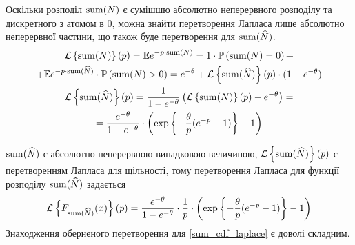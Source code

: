 Оскільки розподіл $\operatorname{sum}(N)$ є сумішшю абсолютно неперервного розподілу та
дискретного з атомом в 0, можна знайти перетворення Лапласа
лише абсолютно неперервної частини, що також буде перетворення для
$\operatorname{sum}(\widehat{N})$.
\begin{gather}
    \mathcal{L}\left\{\operatorname{sum}(N)\right\}(p) = \mathbb{E} e^{-p\cdot\operatorname{sum}(N)} = 
    1 \cdot \mathbb{P}\left(\operatorname{sum}(N) = 0\right) + \nonumber \\ +
    \mathbb{E} e^{-p\cdot\operatorname{sum}(\widehat{N})} \cdot \mathbb{P}\left(\operatorname{sum}(N) > 0\right) =
    e^{-\theta} + \mathcal{L}\left\{\operatorname{sum}(\widehat{N})\right\}(p) \cdot (1-e^{-\theta})
    \nonumber \\
    \mathcal{L}\left\{\operatorname{sum}(\widehat{N})\right\}(p) = \frac{1}{1 - e^{-\theta}}
    \left(\mathcal{L}\left\{\operatorname{sum}(N)\right\}(p) - e^{-\theta}\right) = \nonumber \\ =
    \label{laplace_of_sum_cont}
    \frac{e^{-\theta}}{1 - e^{-\theta}} \cdot 
    \left(\exp\left\{- \frac{\theta}{p}(e^{-p} - 1) \right\} - 1\right)
\end{gather}

$\operatorname{sum}(\widehat{N})$ є абсолютно неперервною випадковою величиною,
$\mathcal{L}\left\{\operatorname{sum}(\widehat{N})\right\}(p)$ є перетворенням Лапласа для щільності, тому
перетворення Лапласа для функції розподілу $\operatorname{sum}(\widehat{N})$
задається 
\begin{equation}\label{sum_cdf_laplace}
    \mathcal{L}\left\{F_{\operatorname{sum}(\widehat{N})}(x)\right\}(p) = 
    \frac{e^{-\theta}}{1 - e^{-\theta}} \cdot \frac{1}{p} \cdot
    \left(\exp\left\{- \frac{\theta}{p}(e^{-p} - 1) \right\} - 1\right)
\end{equation}
Знаходження оберненого перетворення для \eqref{sum_cdf_laplace}
є доволі складним.


